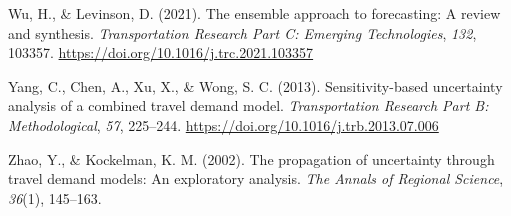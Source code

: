 \documentclass[fancy, masters, twoside]{byuthesis}
\newlength{\cslhangindent}
\newlength{\cslentryspacingunit} %
\newenvironment{CSLReferences}[2] %
 {%
  \setlength{\parindent}{0pt}
  \ifodd #1
  \let\oldpar\par
  \def\par{\hangindent=\cslhangindent\oldpar}
  \fi
  \setlength{\parskip}{#2\cslentryspacingunit}
 }%
 {}
\begin{document}
\begin{CSLReferences}{1}{0}
\leavevmode{}%
Wu, H., \& Levinson, D. (2021). The ensemble approach to forecasting: {A} review and synthesis. \emph{Transportation Research Part C: Emerging Technologies}, \emph{132}, 103357. \url{https://doi.org/10.1016/j.trc.2021.103357}

\leavevmode{}%
Yang, C., Chen, A., Xu, X., \& Wong, S. C. (2013). Sensitivity-based uncertainty analysis of a combined travel demand model. \emph{Transportation Research Part B: Methodological}, \emph{57}, 225--244. \url{https://doi.org/10.1016/j.trb.2013.07.006}

\leavevmode{}%
Zhao, Y., \& Kockelman, K. M. (2002). The propagation of uncertainty through travel demand models: {An} exploratory analysis. \emph{The Annals of Regional Science}, \emph{36}(1), 145--163.

\end{CSLReferences}

\cleardoublepage
\pagestyle{byu}

%
\end{document}

